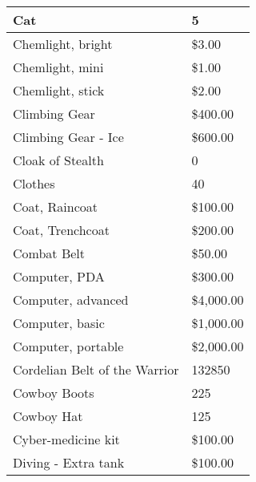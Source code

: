 \documentclass[twoside]{book}
\begin{document}
\begin{longtable}{p{1.25in}l}
  \raggedright
           Cat 
  &
   5 
  \tabularnewline
  \hline
      
  \raggedright
           Chemlight, bright 
  &
   \$3.00 
  \tabularnewline
  \hline
      
  \raggedright
           Chemlight, mini 
  &
   \$1.00 
  \tabularnewline
  \hline
      
  \raggedright
           Chemlight, stick 
  &
   \$2.00 
  \tabularnewline
  \hline
      
  \raggedright
           Climbing Gear 
  &
   \$400.00 
  \tabularnewline
  \hline
      
  \raggedright
           Climbing Gear - Ice 
  &
   \$600.00 
  \tabularnewline
  \hline
      
  \raggedright
           Cloak of Stealth 
  &
   0 
  \tabularnewline
  \hline
      
  \raggedright
           Clothes 
  &
   40 
  \tabularnewline
  \hline
      
  \raggedright
           Coat, Raincoat 
  &
   \$100.00 
  \tabularnewline
  \hline
      
  \raggedright
           Coat, Trenchcoat 
  &
   \$200.00 
  \tabularnewline
  \hline
      
  \raggedright
           Combat Belt 
  &
   \$50.00 
  \tabularnewline
  \hline
      
  \raggedright
           Computer, PDA 
  &
   \$300.00 
  \tabularnewline
  \hline
      
  \raggedright
           Computer, advanced 
  &
   \$4,000.00 
  \tabularnewline
  \hline
      
  \raggedright
           Computer, basic 
  &
   \$1,000.00 
  \tabularnewline
  \hline
      
  \raggedright
           Computer, portable 
  &
   \$2,000.00 
  \tabularnewline
  \hline
      
  \raggedright
           Cordelian Belt of the Warrior
           
  &
   132850 
  \tabularnewline
  \hline
      
  \raggedright
           Cowboy Boots 
  &
   225 
  \tabularnewline
  \hline
      
  \raggedright
           Cowboy Hat 
  &
   125 
  \tabularnewline
  \hline
      
  \raggedright
           Cyber-medicine kit 
  &
   \$100.00 
  \tabularnewline
  \hline
      
  \raggedright
           Diving - Extra tank 
  &
   \$100.00 
  \tabularnewline
  \hline
      

\end{longtable}
\end{document}
